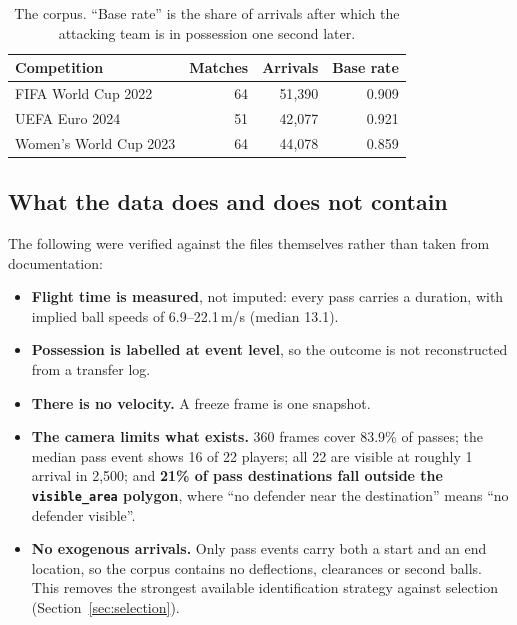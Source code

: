 \documentclass[11pt,a4paper]{article}
\begin{document}
\begin{table}[h]
\centering
\small
\caption{The corpus. ``Base rate'' is the share of arrivals after which the
attacking team is in possession one second later.}
\label{tab:corpus}
\begin{tabular}{lrrr}
\toprule
Competition & Matches & Arrivals & Base rate \\
\midrule
FIFA World Cup 2022     & 64 & 51{,}390 & 0.909 \\
UEFA Euro 2024          & 51 & 42{,}077 & 0.921 \\
Women's World Cup 2023  & 64 & 44{,}078 & 0.859 \\
\bottomrule
\end{tabular}
\end{table}

\subsection{What the data does and does not contain}

The following were verified against the files themselves rather than taken from
documentation:

\begin{itemize}[leftmargin=1.4em, itemsep=0.2em]
  \item \textbf{Flight time is measured}, not imputed: every pass carries a
        duration, with implied ball speeds of 6.9--22.1\,m/s (median 13.1).
  \item \textbf{Possession is labelled at event level}, so the outcome is not
        reconstructed from a transfer log.
  \item \textbf{There is no velocity.} A freeze frame is one snapshot.
  \item \textbf{The camera limits what exists.} 360 frames cover 83.9\% of
        passes; the median pass event shows 16 of 22 players; all 22 are visible
        at roughly 1 arrival in 2{,}500; and \textbf{21\% of pass destinations
        fall outside the \texttt{visible\_area} polygon}, where ``no defender
        near the destination'' means ``no defender visible''.
  \item \textbf{No exogenous arrivals.} Only pass events carry both a start and
        an end location, so the corpus contains no deflections, clearances or
        second balls. This removes the strongest available identification
        strategy against selection (Section~\ref{sec:selection}).
\end{itemize}
\end{document}
